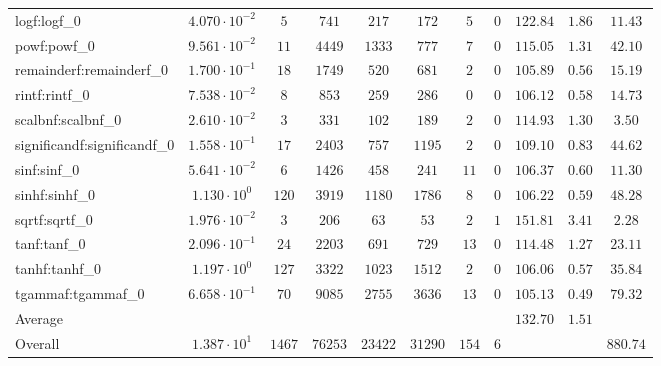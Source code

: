 \begin{tabular}{|l|c|c|c|c|c|c|c|c|c|c|}
logf:logf\_0                 & $ 4.070 \cdot 10^{-2} $ & $ 5      $ & $ 741   $ & $ 217   $ & $ 172   $ & $ 5   $ & $ 0 $ & $ 122.84      $ & $ 1.86    $ & $ 11.43   $ \\
powf:powf\_0                 & $ 9.561 \cdot 10^{-2} $ & $ 11     $ & $ 4449  $ & $ 1333  $ & $ 777   $ & $ 7   $ & $ 0 $ & $ 115.05      $ & $ 1.31    $ & $ 42.10   $ \\
remainderf:remainderf\_0     & $ 1.700 \cdot 10^{-1} $ & $ 18     $ & $ 1749  $ & $ 520   $ & $ 681   $ & $ 2   $ & $ 0 $ & $ 105.89      $ & $ 0.56    $ & $ 15.19   $ \\
rintf:rintf\_0               & $ 7.538 \cdot 10^{-2} $ & $ 8      $ & $ 853   $ & $ 259   $ & $ 286   $ & $ 0   $ & $ 0 $ & $ 106.12      $ & $ 0.58    $ & $ 14.73   $ \\
scalbnf:scalbnf\_0           & $ 2.610 \cdot 10^{-2} $ & $ 3      $ & $ 331   $ & $ 102   $ & $ 189   $ & $ 2   $ & $ 0 $ & $ 114.93      $ & $ 1.30    $ & $ 3.50    $ \\
significandf:significandf\_0 & $ 1.558 \cdot 10^{-1} $ & $ 17     $ & $ 2403  $ & $ 757   $ & $ 1195  $ & $ 2   $ & $ 0 $ & $ 109.10      $ & $ 0.83    $ & $ 44.62   $ \\
sinf:sinf\_0                 & $ 5.641 \cdot 10^{-2} $ & $ 6      $ & $ 1426  $ & $ 458   $ & $ 241   $ & $ 11  $ & $ 0 $ & $ 106.37      $ & $ 0.60    $ & $ 11.30   $ \\
sinhf:sinhf\_0               & $ 1.130 \cdot 10^{0}  $ & $ 120    $ & $ 3919  $ & $ 1180  $ & $ 1786  $ & $ 8   $ & $ 0 $ & $ 106.22      $ & $ 0.59    $ & $ 48.28   $ \\
sqrtf:sqrtf\_0               & $ 1.976 \cdot 10^{-2} $ & $ 3      $ & $ 206   $ & $ 63    $ & $ 53    $ & $ 2   $ & $ 1 $ & $ 151.81      $ & $ 3.41    $ & $ 2.28    $ \\
tanf:tanf\_0                 & $ 2.096 \cdot 10^{-1} $ & $ 24     $ & $ 2203  $ & $ 691   $ & $ 729   $ & $ 13  $ & $ 0 $ & $ 114.48      $ & $ 1.27    $ & $ 23.11   $ \\
tanhf:tanhf\_0               & $ 1.197 \cdot 10^{0}  $ & $ 127    $ & $ 3322  $ & $ 1023  $ & $ 1512  $ & $ 2   $ & $ 0 $ & $ 106.06      $ & $ 0.57    $ & $ 35.84   $ \\
tgammaf:tgammaf\_0           & $ 6.658 \cdot 10^{-1} $ & $ 70     $ & $ 9085  $ & $ 2755  $ & $ 3636  $ & $ 13  $ & $ 0 $ & $ 105.13      $ & $ 0.49    $ & $ 79.32   $ \\
\hline
Average                      & $                     $ & $        $ & $       $ & $       $ & $       $ & $     $ & $   $ & $ 132.70      $ & $ 1.51    $ & $         $ \\
\hline
Overall                      & $ 1.387 \cdot 10^{1}  $ & $ 1467   $ & $ 76253 $ & $ 23422 $ & $ 31290 $ & $ 154 $ & $ 6 $ & $             $ & $         $ & $ 880.74  $ \\
\hline
\end{tabular}
